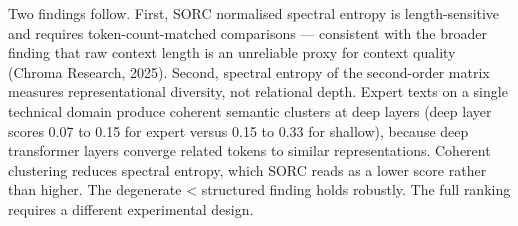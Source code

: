 \documentclass[12pt]{article}
\begin{document}
Two findings follow. First, SORC normalised spectral entropy is
length-sensitive and requires token-count-matched comparisons ---
consistent with the broader finding that raw context length is an
unreliable proxy for context quality (Chroma Research, 2025). Second,
spectral entropy of the second-order matrix measures representational
diversity, not relational depth. Expert texts on a single technical
domain produce coherent semantic clusters at deep layers (deep layer
scores 0.07 to 0.15 for expert versus 0.15 to 0.33 for shallow), because
deep transformer layers converge related tokens to similar
representations. Coherent clustering reduces spectral entropy, which
SORC reads as a lower score rather than higher. The degenerate
\textless{} structured finding holds robustly. The full ranking requires
a different experimental design.
\end{document}
